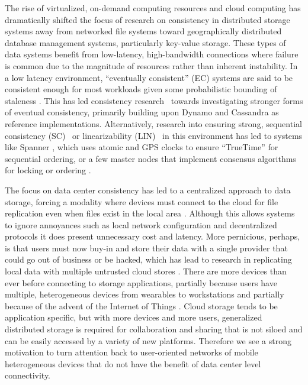 The rise of virtualized, on-demand computing resources and cloud
computing has dramatically shifted the focus of research on
consistency in distributed storage systems away from networked file
systems toward geographically distributed database management systems,
particularly key-value storage.
These types of data systems benefit from low-latency, high-bandwidth
connections where failure is common due to the magnitude of resources
rather than inherent instability.
In a low latency environment, ``eventually consistent'' (EC)
\cite{vogels_eventually_2009} systems are said to be consistent enough
for most workloads given some probabilistic bounding of staleness
\cite{bailis_quantifying_2014,bermbach_metastorage:_2011,pbft}.
This has led consistency
research~\cite{bailis2013highly,bailis2014coordination,mahajan2011consistency,alvaro2013consistency,zawirski2015write}
towards investigating stronger forms of eventual consistency,
primarily building upon Dynamo \cite{decandia_dynamo:_2007} and
Cassandra \cite{lakshman_cassandra:_2010} as reference
implementations.
Alternatively, research into ensuring strong, sequential consistency
(SC)~\cite{sequential-consistency} or linearizability
(LIN)~\cite{herlihy_linearizability:_1990} in this environment has led
to systems like Spanner \cite{spanner}, which uses atomic and GPS
clocks to ensure ``TrueTime'' for sequential ordering, or a few master
nodes that implement consensus algorithms \cite{paxos} for locking or
ordering \cite{kraska_mdcc:_2013}.

The focus on data center consistency has led to a centralized approach to data storage,
forcing a modality where devices must connect to the cloud for file replication even when
files exist in the local area \cite{drago_inside_2012}.
Although this allows systems to ignore annoyances such as local network configuration and
decentralized protocols it does present unnecessary cost and latency.
More pernicious, perhaps, is that users must now buy-in and store their data with a single
provider that could go out of business or be hacked, which has lead to research in
replicating local data with multiple untrusted cloud stores
\cite{zhang_viewbox:_2014,sporc}.
There are more devices than ever before connecting to storage applications, partially
because users have multiple, heterogeneous devices from wearables to workstations and
partially because of the advent of the Internet of Things \cite{miorandi_internet_2012}.
Cloud storage tends to be application specific, but with more devices and more users,
generalized distributed storage is required for collaboration and sharing that is
not siloed and can be easily accessed by a variety of new platforms.
Therefore we see a strong motivation to turn attention back to user-oriented networks of
mobile heterogeneous devices that do not have the benefit of data center level
connectivity.

